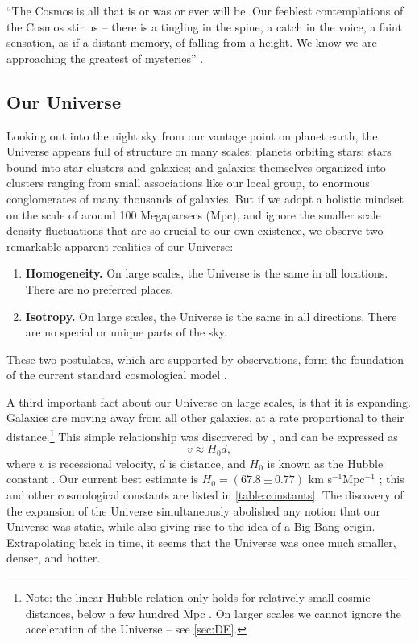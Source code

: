 ``The Cosmos is all that is or was or ever will be. Our feeblest contemplations of the Cosmos stir us -- there is a tingling in the spine, a catch in the voice, a faint sensation, as if a distant memory, of falling from a height. We know we are approaching the greatest of mysteries'' \citep{Sagan80}.


\subsection{Our Universe}

Looking out into the night sky from our vantage point on planet earth, the Universe appears full of structure on many scales: planets orbiting stars; stars bound into star clusters and galaxies; and galaxies themselves organized into clusters ranging from small associations like our local group, to enormous conglomerates of many thousands of galaxies. But if we adopt a holistic mindset on the scale of around 100 Megaparsecs (Mpc), and ignore the smaller scale density fluctuations that are so crucial to our own existence, we observe two remarkable apparent realities of our Universe:
\begin{enumerate}
\item {\bf Homogeneity.} On large scales, the Universe is the same in all locations. There are no preferred places.
\item {\bf Isotropy.} On large scales, the Universe is the same in all directions. There are no special or unique parts of the sky.
\end{enumerate}
These two postulates, which are supported by observations, form the foundation of the current standard cosmological model \citep[e.g.][]{PeeblesText,DodelsonText,RydenText}.

A third important fact about our Universe on large scales, is that it is expanding. Galaxies are moving away from all other galaxies, at a rate proportional to their distance.\footnote{Note: the linear Hubble relation only holds for relatively small cosmic distances, below a few hundred Mpc \citep{RydenText}. On larger scales we cannot ignore the acceleration of the Universe -- see \autoref{sec:DE}.} This simple relationship was discovered by \citet{Hubble29}, and can be expressed as
\begin{equation}
v \approx H_0 d,
\end{equation}
where $v$ is recessional velocity, $d$ is distance, and $H_0$ is known as the Hubble constant \citep{RydenText}. Our current best estimate is $H_0 = (67.8\pm0.77)$ km s$^{-1}$Mpc$^{-1}$ \citep{PlanckXVI}; this and other cosmological constants are listed in \autoref{table:constants}. The discovery of the expansion of the Universe simultaneously abolished any notion that our Universe was static, while also giving rise to the idea of a Big Bang origin. Extrapolating back in time, it seems that the Universe was once much smaller, denser, and hotter. 

